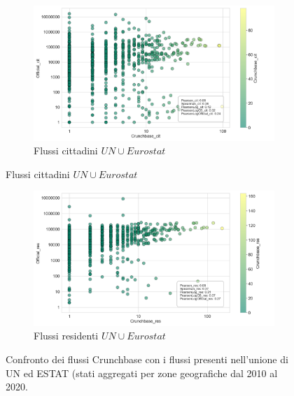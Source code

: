 \begin{figure}[ht]
    \begin{subfigure}{\textwidth}
        \centering
        \includegraphics[width=1\textwidth]{images/congiunti/Flows/Official_cit_True.png}
        \caption{Flussi cittadini \(UN\cup{Eurostat}\)}
        \label{fig:off_true_cit}
    \end{subfigure}
\end{figure}
\begin{figure}[tb]\ContinuedFloat
    \begin{subfigure}{\textwidth}
        \centering
        \includegraphics[width=1\textwidth]{images/congiunti/Flows/Official_res_True.png}
        \caption{Flussi residenti \(UN\cup{Eurostat}\)}
        \label{fig:off_true_res}
    \end{subfigure}
    \caption{Confronto dei flussi Crunchbase con i flussi presenti nell'unione di UN ed ESTAT (stati aggregati per zone geografiche dal 2010 al 2020.}
    \label{fig:off_true}
\end{figure}

\FloatBarrier


